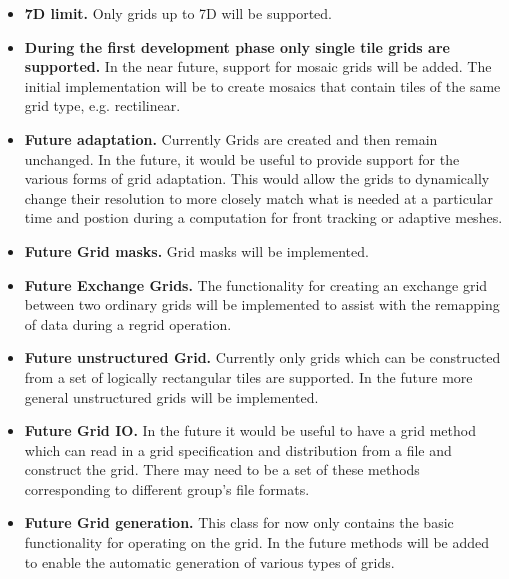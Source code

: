 

\begin{itemize}

\item {\bf 7D limit.}  Only grids up to 7D will be supported.

\item {\bf During the first development phase only single
tile grids are supported.}  In the near future, support
for mosaic grids will be added.  The initial implementation 
will be to create mosaics that contain tiles of the same
grid type, e.g. rectilinear.

\item {\bf Future adaptation.}  Currently Grids
are created and then remain unchanged. In the future, it would
be useful to provide support for the various forms of grid
adaptation. This would allow the grids to dynamically change
their resolution to more closely match what is needed at a particular
time and postion during a computation for front tracking or adaptive meshes.

\item {\bf Future Grid masks.}  Grid masks will be implemented.

\item {\bf Future Exchange Grids.}  The functionality for creating an 
exchange grid between two ordinary grids will be implemented
to assist with the remapping of data during a regrid operation. 

\item {\bf Future unstructured Grid.}  Currently only grids which can be constructed from a set of logically rectangular tiles are supported. In the future more general unstructured grids will be implemented.

\item {\bf Future Grid IO.} In the future it would be useful to have a grid method which can read in a grid specification and distribution from a file and construct the grid. There may need to be a set of these methods corresponding to different group's file formats.

\item {\bf Future Grid generation.} This class for now only contains
the basic functionality for operating on the grid. In the future
methods will be added to enable the automatic generation of various types of
grids. 


\end{itemize}

